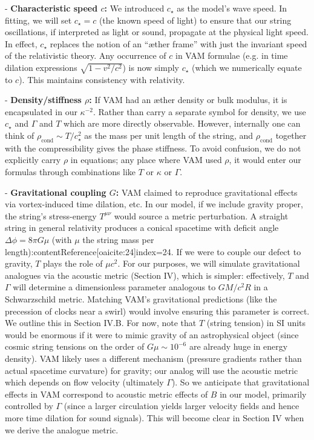 \documentclass[12pt]{article}
\begin{document}
- \textbf{Characteristic speed $c$:} We introduced $c_\star$ as the model’s wave speed. In fitting, we will set $c_\star = c$ (the known speed of light) to ensure that our string oscillations, if interpreted as light or sound, propagate at the physical light speed. In effect, $c_\star$ replaces the notion of an “æther frame” with just the invariant speed of the relativistic theory. Any occurrence of $c$ in VAM formulae (e.g. in time dilation expressions $\sqrt{1-v^2/c^2}$) is now simply $c_\star$ (which we numerically equate to $c$). This maintains consistency with relativity.

- \textbf{Density/stiffness $\rho$:} If VAM had an æther density or bulk modulus, it is encapsulated in our $\kappa^{-2}$. Rather than carry a separate symbol for density, we use $c_\star$ and $\Gamma$ and $T$ which are more directly observable. However, internally one can think of $\rho_{\text{cond}} \sim T/c_\star^2$ as the mass per unit length of the string, and $\rho_{\text{cond}}$ together with the compressibility gives the phase stiffness. To avoid confusion, we do not explicitly carry $\rho$ in equations; any place where VAM used $\rho$, it would enter our formulas through combinations like $T$ or $\kappa$ or $\Gamma$.

- \textbf{Gravitational coupling $G$:} VAM claimed to reproduce gravitational effects via vortex-induced time dilation, etc. In our model, if we include gravity proper, the string’s stress-energy $T^{\mu\nu}$ would source a metric perturbation. A straight string in general relativity produces a conical spacetime with deficit angle $ \Delta \phi = 8\pi G \mu$ (with $\mu$ the string mass per length):contentReference[oaicite:24]{index=24}. If we were to couple our defect to gravity, $T$ plays the role of $\mu c^2$. For our purposes, we will simulate gravitational analogues via the acoustic metric (Section IV), which is simpler: effectively, $T$ and $\Gamma$ will determine a dimensionless parameter analogous to $GM/c^2R$ in a Schwarzschild metric. Matching VAM’s gravitational predictions (like the precession of clocks near a swirl) would involve ensuring this parameter is correct. We outline this in Section IV.B. For now, note that $T$ (string tension) in SI units would be enormous if it were to mimic gravity of an astrophysical object (since cosmic string tensions on the order of $G\mu \sim 10^{-6}$ are already huge in energy density). VAM likely uses a different mechanism (pressure gradients rather than actual spacetime curvature) for gravity; our analog will use the acoustic metric which depends on flow velocity (ultimately $\Gamma$). So we anticipate that gravitational effects in VAM correspond to acoustic metric effects of $B$ in our model, primarily controlled by $\Gamma$ (since a larger circulation yields larger velocity fields and hence more time dilation for sound signals). This will become clear in Section IV when we derive the analogue metric.
\end{document}
